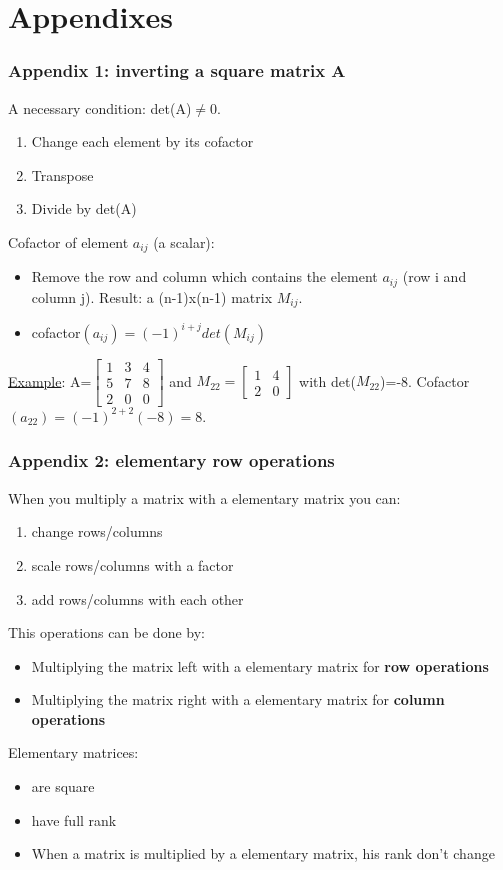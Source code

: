 \section{Appendixes}

\begin{frame}
	\frametitle{Appendix 1: inverting a square matrix A}
		A necessary condition: det(A)$\neq$0.
		\begin{enumerate}
			\item Change each element by its cofactor
			\item Transpose
			\item Divide by det(A) 
		\end{enumerate}
		Cofactor of element $a_{ij}$ (a scalar):
		\begin{itemize}
			\item Remove the row and column which contains the element $a_{ij}$ (row i and column j). Result: a (n-1)x(n-1) matrix $M_{ij}$.
			\item cofactor$(a_{ij})=(-1)^{i+j}det(M_{ij})$
		\end{itemize}
		\underline{Example}: A=$\begin{bmatrix} 1 & 3& 4\\
		5 & 7 & 8\\
		2 & 0 & 0 \end{bmatrix}$ and $M_{22}=\begin{bmatrix}
		1 & 4\\
		2 & 0
		\end{bmatrix}$ with det($M_{22}$)=-8. Cofactor$(a_{22})=(-1)^{2+2}(-8)=8$.
\end{frame}

\begin{frame}
	\frametitle{Appendix 2: elementary row operations}
	When you multiply a matrix with a elementary matrix you can:
	\begin{enumerate}
		\item change rows/columns  
		\item scale rows/columns with a factor
		\item add rows/columns with each other
	\end{enumerate}
	This operations can be done by:
	\begin{itemize}
	\item Multiplying the matrix left with a elementary matrix for \textbf{row operations}
	\item Multiplying the matrix right with a elementary matrix for \textbf{column operations}
	\end{itemize}
	Elementary matrices:
	\begin{itemize}
	\item are square \\
	\item have full rank\\
	\item When a matrix is multiplied by a elementary matrix, his rank don't change
	\end{itemize}
\end{frame}

